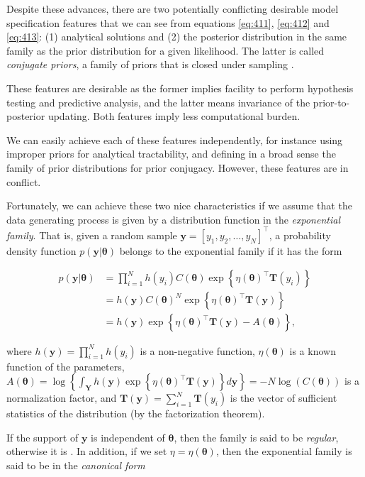 Despite these advances, there are two potentially conflicting desirable model specification features that we can see from equations \ref{eq:411}, \ref{eq:412} and \ref{eq:413}: (1) analytical solutions and (2) the posterior distribution in the same family as the prior distribution for a given likelihood. The latter is called \textit{conjugate priors}, a family of priors that is closed under sampling \cite{schlaifer1961applied}.

These features are desirable as the former implies facility to perform hypothesis testing and predictive analysis, and the latter means invariance of the prior-to-posterior updating. Both features imply less computational burden.

We can easily achieve each of these features independently, for instance using improper priors for analytical tractability, and defining in a broad sense the family of prior distributions for prior conjugacy. However, these features are in conflict. 

Fortunately, we can achieve these two nice characteristics if we assume that the data generating process is given by a distribution function in the \textit{exponential family}. That is, given a random sample $\mathbf{y}=[y_1,y_2,\dots,y_N]^{\top}$, a probability density function $p(\mathbf{y}|\mathbf{\theta})$ belongs to the exponential family if it has the form

\begin{align}
	p(\mathbf{y}|\mathbf{\theta})&=\prod_{i=1}^N h(y_i) C(\mathbf{\theta}) \exp\left\{\eta(\mathbf{\theta})^{\top}\mathbf{T}(y_i)\right\}\label{eq:414}\\ 
	&=h(\mathbf{y}) C(\mathbf{\theta})^N\exp\left\{\eta(\mathbf{\theta})^{\top}\mathbf{T}(\mathbf{y})\right\}\nonumber \\
	&=h(\mathbf{y})\exp\left\{\eta(\mathbf{\theta})^{\top}\mathbf{T}(\mathbf{y})-A(\mathbf{\theta})\right\}\nonumber,
\end{align}

where $h(\mathbf{y})=\prod_{i=1}^N h(y_i)$ is a non-negative function, $\eta(\mathbf{\theta})$ is a known function of the parameters, $A(\mathbf{\theta})=\log\left\{\int_{\mathbf{Y}}h(\mathbf{y})\exp\left\{\eta(\mathbf{\theta})^{\top}\mathbf{T}(\mathbf{y})\right\}d\mathbf{y}\right\}=-N\log(C(\mathbf{\theta}))$ is a normalization factor, and $\mathbf{T}(\mathbf{y})=\sum_{i=1}^N\mathbf{T}(y_i)$ is the vector of sufficient statistics of the distribution (by the factorization theorem).  

If the support of $\mathbf{y}$ is independent of $\mathbf{\theta}$, then the family is said to be \textit{regular}, otherwise it is . In addition, if we set $\eta=\eta(\mathbf{\theta})$, then the exponential family is said to be in the \textit{canonical form} 

